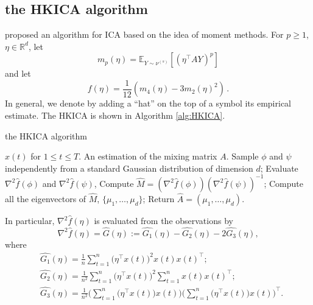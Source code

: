 \documentclass[twoside]{article}
\newcommand{\E}{\mathbb{E}}
\newcommand{\real}{\mathbb{R}}
\theoremstyle{definition}
\begin{document}
\subsection{the HKICA algorithm}
\label{subsec:HKalg}
\citet{DHsu2012} proposed an algorithm for ICA based on the idea of moment methods.
For $p\ge 1$, $\eta\in \real^d$, 
let 
\begin{equation}
\label{eq:momnent}
m_p(\eta) = \E_{Y\sim \nu^{(s)}}[ (\eta^\top A Y)^p ]
\end{equation}
and let
\begin{equation}
\label{eq:funcf}
f(\eta) = \frac1{12} \left( m_4(\eta) - 3 m_2(\eta)^2 \right)\,.
\end{equation}
In general, we denote by adding a ``hat'' on the top of a symbol its empirical estimate. 
The HKICA is shown in Algorithm \ref{alg:HKICA}.
\begin{algorithm}[H]
\caption{the HKICA algorithm}
\label{alg:HKICA}
\begin{algorithmic}[1]
\INPUT $x(t)$ for $1\le t \le T$. 
\OUTPUT An estimation of the mixing matrix $A$. 
\STATE Sample $\phi$ and $\psi$ independently from a standard Gaussian distribution of dimension $d$;
\STATE Evaluate $\nabla^2\widehat{f}(\phi)$ and $\nabla^2\widehat{f}(\psi)$, 
\STATE Compute $\widehat{M} = (\nabla^2 \widehat{f}(\phi))(\nabla^2\widehat{f}(\psi))^{-1}$;
\STATE Compute all the eigenvectors of $\widehat{M}$, $\{\mu_1,\ldots,\mu_d\}$;
\STATE Return $\widehat{A} = (\mu_1,\ldots,\mu_d)$.
\end{algorithmic}
\end{algorithm}
In particular, $\nabla^2\widehat{f}(\eta)$  is evaluated from the observations by
\begin{equation}
\label{eq:G}
\nabla^2 \widehat{f}(\eta) = \widehat{G}(\eta):= \widehat{G_1}(\eta) - \widehat{G_2}(\eta) -2\widehat{G_3}(\eta),
\end{equation}
where 
\begin{align*}
&\widehat{ G_1}(\eta) = \frac1n\sum_{t=1}^{n} \big(\eta^{\top}x(t)\big)^2x(t)x(t)^{\top}; \\
& \widehat{G_2}(\eta) = \frac{1}{n^2}\sum_{t=1}^{n} \big(\eta^{\top}x(t)\big)^2 \sum_{t=1}^{n}x(t)x(t)^{\top}; \\
& \widehat{G_3}(\eta) = \frac{1}{n^2}\Big(\sum_{t=1}^{n} \big(\eta^{\top}x(t)\big)x(t)\Big) \Big(\sum_{t=1}^{n} \big(\eta^{\top}x(t)\big)x(t)\Big)^{\top}.
\end{align*} 
\end{document}
